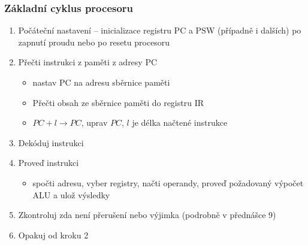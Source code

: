 \begin{frame}
\frametitle{Základní cyklus procesoru}
\begin{enumerate}
  \item Počáteční nastavení -- inicializace registru PC a PSW (případně i dalších) po zapnutí proudu nebo po resetu procesoru
  \item Přečti instrukci z paměti z adresy PC
  \begin{itemize}
    \item nastav PC na adresu sběrnice paměti
    \item Přečti obsah ze sběrnice paměti do registru IR
    \item $PC+l \to PC$, uprav $PC$, $l$ je délka načtené instrukce
  \end{itemize}
  \item Dekóduj instrukci
  \item Proveď instrukci
  \begin{itemize}
    \item spočti adresu, vyber registry, načti operandy, proveď požadovaný výpočet ALU a ulož výsledky
  \end{itemize}
  \item Zkontroluj zda není přerušení nebo výjimka (podrobně v přednášce 9)
  \item Opakuj od kroku 2
\end{enumerate}
\end{frame}


